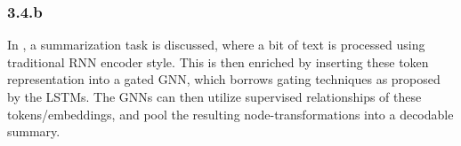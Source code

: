 \subsubsection*{3.4.b}
In \cite{fernandes2020structured}, a summarization task is discussed, where a bit of text is processed
using traditional RNN encoder style. This is then enriched by inserting these token representation into
a gated GNN, which borrows gating techniques as proposed by the LSTMs. The GNNs can then utilize 
supervised relationships of these tokens/embeddings, and pool the resulting node-transformations
into a decodable summary.
